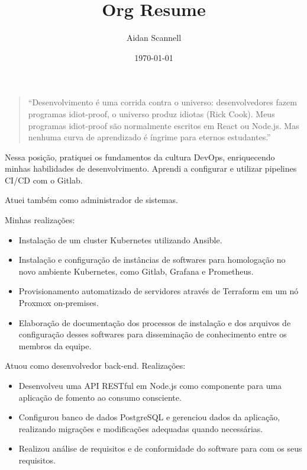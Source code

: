 \documentclass[10pt,a4paper,ragged2e,withhyper]{altacv}
\author{Aidan Scannell}
\date{\today}
\title{Org Resume}
\begin{document}

\makecvheader

\begin{paracol}{2}

\begin{quote}
 ``Desenvolvimento é uma corrida contra o universo: desenvolvedores fazem programas idiot-proof, o universo produz idiotas (Rick Cook). Meus programas idiot-proof são normalmente escritos em React ou Node.js. Mas nenhuma curva de aprendizado é íngrime para eternos estudantes.''
\end{quote}
\label{sec:orgb4db928}

Nessa posição, pratiquei os fundamentos da cultura DevOps, enriquecendo minhas habilidades de desenvolvimento.
Aprendi a configurar e utilizar pipelines CI/CD com o Gitlab.

Atuei também como administrador de sistemas.

Minhas realizações:
\begin{itemize}
\item Instalação de um cluster Kubernetes utilizando Ansible.
\item Instalação e configuração de instâncias de softwares para homologação no novo ambiente Kubernetes, como
Gitlab, Grafana e Prometheus.
\item Provisionamento automatizado de servidores através de Terraform em um nó Proxmox on-premises.
\item Elaboração de documentação dos processos de instalação e dos arquivos de configuração desses softwares
para disseminação de conhecimento entre os membros da equipe.
\end{itemize}

\par\divider
{}

Atuou como desenvolvedor back-end. Realizações:
\begin{itemize}
\item Desenvolveu uma API RESTful em Node.js como componente para uma aplicação de fomento ao consumo consciente.
\item Configurou banco de dados PostgreSQL e gerenciou dados da aplicação, realizando migrações e modificações adequadas quando necessárias.
\item Realizou análise de requisitos e de conformidade do software para com os seus requisitos.
\end{itemize}


\end{paracol}
\end{document}
